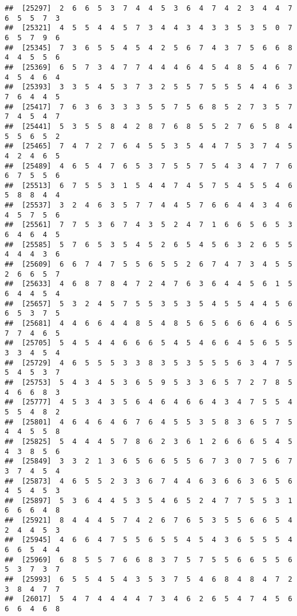 \documentclass[
]{book}
\begin{document}
\begin{verbatim}
##  [25297]  2  6  6  5  3  7  4  4  5  3  6  4  7  4  2  3  4  4  7  6  5  5  7  3
##  [25321]  4  5  5  4  4  5  7  3  4  4  3  4  3  3  5  3  5  0  7  6  5  7  9  6
##  [25345]  7  3  6  5  5  4  5  4  2  5  6  7  4  3  7  5  6  6  8  4  4  5  5  6
##  [25369]  6  5  7  3  4  7  7  4  4  4  6  4  5  4  8  5  4  6  7  4  5  4  6  4
##  [25393]  3  3  5  4  5  3  7  3  2  5  5  7  5  5  5  4  4  6  3  7  6  4  4  5
##  [25417]  7  6  3  6  3  3  3  5  5  7  5  6  8  5  2  7  3  5  7  7  4  5  4  7
##  [25441]  5  3  5  5  8  4  2  8  7  6  8  5  5  2  7  6  5  8  4  5  5  6  5  2
##  [25465]  7  4  7  2  7  6  4  5  5  3  5  4  4  7  5  3  7  4  5  4  2  4  6  5
##  [25489]  4  6  5  4  7  6  5  3  7  5  5  7  5  4  3  4  7  7  6  6  7  5  5  6
##  [25513]  6  7  5  5  3  1  5  4  4  7  4  5  7  5  4  5  5  4  6  5  8  8  4  4
##  [25537]  3  2  4  6  3  5  7  7  4  4  5  7  6  6  4  4  3  4  6  4  5  7  5  6
##  [25561]  7  7  5  3  6  7  4  3  5  2  4  7  1  6  6  5  6  5  3  6  4  6  4  5
##  [25585]  5  7  6  5  3  5  4  5  2  6  5  4  5  6  3  2  6  5  5  4  4  4  3  6
##  [25609]  6  6  7  4  7  5  5  6  5  5  2  6  7  4  7  3  4  5  5  2  6  6  5  7
##  [25633]  4  6  8  7  8  4  7  2  4  7  6  3  6  4  4  5  6  1  5  6  4  4  5  4
##  [25657]  5  3  2  4  5  7  5  5  3  5  3  5  4  5  5  4  4  5  6  6  5  3  7  5
##  [25681]  4  4  6  6  4  4  8  5  4  8  5  6  5  6  6  6  4  6  5  7  7  4  6  5
##  [25705]  5  4  5  4  4  6  6  6  5  4  5  4  6  6  4  5  6  5  5  3  3  4  5  4
##  [25729]  4  6  5  5  5  3  3  8  3  5  3  5  5  5  6  3  4  7  5  5  4  5  3  7
##  [25753]  5  4  3  4  5  3  6  5  9  5  3  3  6  5  7  2  7  8  5  4  6  6  8  3
##  [25777]  4  5  3  4  3  5  6  4  6  4  6  6  4  3  4  7  5  5  4  5  5  4  8  2
##  [25801]  4  6  4  6  4  6  7  6  4  5  5  3  5  8  3  6  5  7  5  4  4  5  5  8
##  [25825]  5  4  4  4  5  7  8  6  2  3  6  1  2  6  6  6  5  4  5  4  3  8  5  6
##  [25849]  3  3  2  1  3  6  5  6  6  5  5  6  7  3  0  7  5  6  7  3  7  4  5  4
##  [25873]  4  6  5  5  2  3  3  6  7  4  4  6  3  6  6  3  6  5  6  4  5  4  5  3
##  [25897]  5  3  6  4  4  5  3  5  4  6  5  2  4  7  7  5  5  3  1  6  6  6  4  8
##  [25921]  8  4  4  4  5  7  4  2  6  7  6  5  3  5  5  6  6  5  4  2  4  4  5  3
##  [25945]  4  6  6  4  7  5  5  6  5  5  4  5  4  3  6  5  5  5  4  6  6  5  4  4
##  [25969]  6  8  5  5  7  6  6  8  3  7  5  7  5  5  6  6  5  5  6  5  3  7  3  7
##  [25993]  6  5  5  4  5  4  3  5  3  7  5  4  6  8  4  8  4  7  2  3  8  4  7  7
##  [26017]  5  4  7  4  4  4  4  7  3  4  6  2  6  5  4  7  4  5  6  6  6  4  6  8

\end{verbatim}
\end{document}
